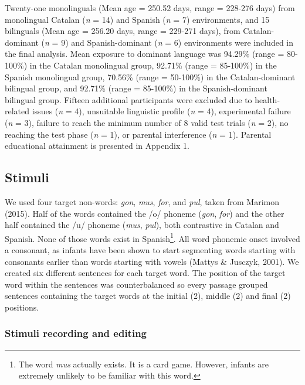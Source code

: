 \documentclass[man,floatsintext]{apa6}
\let\rmarkdownfootnote\footnote%
\def\footnote{\protect\rmarkdownfootnote}
\begin{document}
Twenty-one monolinguals (Mean age = 250.52 days, range = 228-276 days) from monolingual Catalan (\emph{n} = 14) and Spanish (\emph{n} = 7) environments, and 15 bilinguals (Mean age = 256.20 days, range = 229-271 days), from Catalan-dominant (\emph{n} = 9) and Spanish-dominant (\emph{n} = 6) environments were included in the final analysis. Mean exposure to dominant language was 94.29\% (range = 80-100\%) in the Catalan monolingual group, 92.71\% (range = 85-100\%) in the Spanish monolingual group, 70.56\% (range = 50-100\%) in the Catalan-dominant bilingual group, and 92.71\% (range = 85-100\%) in the Spanish-dominant bilingual group. Fifteen additional participants were excluded due to health-related issues (\emph{n} = 4), unsuitable linguistic profile (\emph{n} = 4), experimental failure (\emph{n} = 3), failure to reach the minimum number of 8 valid test trials (\emph{n} = 2), no reaching the test phase (\emph{n} = 1), or parental interference (\emph{n} = 1). Parental educational attainment is presented in Appendix 1.

\hypertarget{stimuli}{%
\subsection{Stimuli}\label{stimuli}}

We used four target non-words: \emph{gon}, \emph{mus}, \emph{for}, and \emph{pul}, taken from Marimon (2015). Half of the words contained the /o/ phoneme (\emph{gon}, \emph{for}) and the other half contained the /u/ phoneme (\emph{mus}, \emph{pul}), both contrastive in Catalan and Spanish. None of those words exist in Spanish\footnote{The word \emph{mus} actually exists. It is a card game. However, infants are extremely unlikely to be familiar with this word.}. All word phonemic onset involved a consonant, as infants have been shown to start segmenting words starting with consonants earlier than words starting with vowels (Mattys \& Jusczyk, 2001). We created six different sentences for each target word. The position of the target word within the sentences was counterbalanced so every passage grouped sentences containing the target words at the initial (2), middle (2) and final (2) positions.

\hypertarget{stimuli-recording-and-editing}{%
\subsubsection{Stimuli recording and editing}\label{stimuli-recording-and-editing}}
\end{document}
